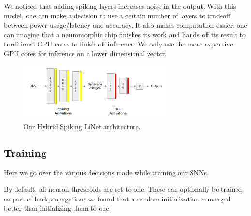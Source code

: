 \documentclass[../taasin.tex]{subfiles}
\begin{document}
We noticed that adding spiking layers increases noise in the output. With this model, one can make a decision to use a certain number of layers to tradeoff between power usage/latency and accuracy. It also makes computation easier; one can imagine that a neuromorphic chip finishes its work and hands off its result to traditional GPU cores to finish off inference. We only use the more expensive GPU cores for inference on a lower dimensional vector.

\begin{figure}[h]
    \centering
    \includegraphics[width=0.7\textwidth]{figures/arch_hybrid.pdf}
    \caption{Our Hybrid Spiking LiNet architecture.}
    \label{fig:hybrid_arch}
\end{figure}

\noindent\begin{minipage}{.45\textwidth}

\end{minipage}\hfill
\begin{minipage}{.45\textwidth}

\end{minipage}




\subsection{Training}

Here we go over the various decisions made while training our SNNs.

By default, all neuron thresholds are set to one. These can optionally be trained as part of backpropagation; we found that a random initialization converged better than initializing them to one.
\end{document}
